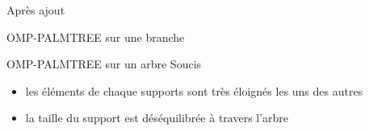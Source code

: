 \begin{frame}{Après ajout}
\begin{figure}\centering
\end{figure}
\end{frame}

\begin{frame}{OMP-PALMTREE sur une branche}
\end{frame}


\begin{frame}{OMP-PALMTREE sur un arbre}
Soucis
\begin{itemize}
	\item les éléments de chaque supports sont très éloignés les uns des autres
	\item la taille du support est déséquilibrée à travers l'arbre
\end{itemize}
\end{frame}


